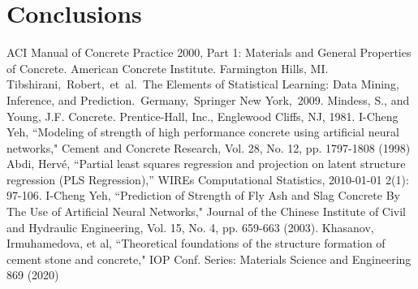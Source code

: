 \documentclass[conference]{IEEEtran}
\begin{document}
\section{Conclusions}\label{sec:conclusions}


\begin{thebibliography}{00}
 ACI Manual of Concrete Practice 2000, Part 1: Materials and General Properties of Concrete.  American Concrete Institute.  Farmington Hills, MI.
 Tibshirani, Robert, et al. The Elements of  Statistical Learning:  Data Mining, Inference, and Prediction. Germany, Springer New York, 2009.
 Mindess, S., and Young, J.F. Concrete. Prentice-Hall, Inc., Englewood Cliffs, NJ, 1981.
 I-Cheng Yeh, ``Modeling of strength of high performance concrete using artificial neural networks," Cement and Concrete Research, Vol. 28, No. 12, pp. 1797-1808 (1998)
 Abdi, Hervé, ``Partial least squares regression and projection on latent structure regression (PLS Regression),'' WIREs Computational Statistics, 2010-01-01 2(1): 97-106.
 I-Cheng Yeh, ``Prediction of Strength of Fly Ash and Slag Concrete By The Use of Artificial Neural Networks," Journal of the Chinese Institute of Civil and Hydraulic Engineering, Vol. 15, No. 4, pp. 659-663 (2003). 
 Khasanov, Irmuhamedova, et al, ``Theoretical foundations of the structure formation of cement stone
and concrete," IOP Conf. Series: Materials Science and Engineering 869 (2020)
\end{thebibliography}
\end{document}
